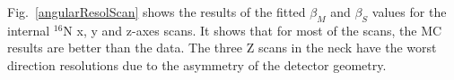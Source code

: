 Fig.~\ref{angularResolScan} shows the results of the fitted $\beta_M$ and $\beta_S$ values for the internal $^{16}$N x, y and z-axes scans. It shows that for most of the scans, the MC results are better than the data. The three Z scans in the neck have the worst direction resolutions due to the asymmetry of the detector geometry. 

\begin{figure}
	\centering

\end{figure}
